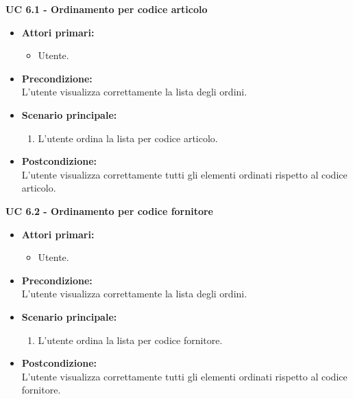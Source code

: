 \vspace{0.5cm}

\noindent \textbf{\large UC 6.1 - Ordinamento per codice articolo }
\label{uc:ordinamento-codice-articolo}
\begin{itemize}

	\item \textbf{Attori primari: }
		\begin{itemize}
			\item Utente.
		\end{itemize}

	\item \textbf{Precondizione: }\\[0.3cm]
		L'utente visualizza correttamente la lista degli ordini.
\item \textbf{Scenario principale: }
		\begin{enumerate}
			\item L'utente ordina la lista per codice articolo.
		\end{enumerate}
		

	\item \textbf{Postcondizione: }\\[0.3cm]
		L'utente visualizza correttamente tutti gli elementi ordinati rispetto al codice articolo.

\end{itemize}

\vspace{0.5cm}

\noindent \textbf{\large UC 6.2 - Ordinamento per codice fornitore }
\label{uc:ordinamento-codice-fornitore}
\begin{itemize}

	\item \textbf{Attori primari: }
		\begin{itemize}
			\item Utente.
		\end{itemize}

	\item \textbf{Precondizione: }\\[0.3cm]
		L'utente visualizza correttamente la lista degli ordini.

	\item \textbf{Scenario principale: }
		\begin{enumerate}
			\item L'utente ordina la lista per codice fornitore.
		\end{enumerate}
		

	\item \textbf{Postcondizione: }\\[0.3cm]
		L'utente visualizza correttamente tutti gli elementi ordinati rispetto al codice fornitore.

\end{itemize}

